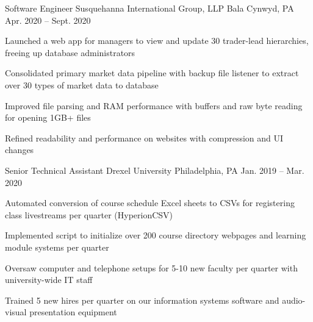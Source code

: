 

\begin{cventries}

  \cventry
  {Software Engineer} %
  {Susquehanna International Group, LLP} %
  {Bala Cynwyd, PA} %
  {Apr. 2020 -- Sept. 2020} %
  {
    \begin{cvitems} %
      \item {Launched a web app for managers to view and update 30 trader-lead hierarchies, freeing up database administrators}
      \item {Consolidated primary market data pipeline with backup file listener to extract over 30 types of market data to database}
      \item {Improved file parsing and RAM performance with buffers and raw byte reading for opening 1GB+ files}
      \item {Refined readability and performance on websites with compression and UI changes}
    \end{cvitems}
  }

  \cventry
  {Senior Technical Assistant} %
  {Drexel University} %
  {Philadelphia, PA} %
  {Jan. 2019 -- Mar. 2020} %
  {
    \begin{cvitems} %
      \item {Automated conversion of course schedule Excel sheets to CSVs for registering class livestreams per quarter (HyperionCSV)}
      \item {Implemented script to initialize over 200 course directory webpages and learning module systems per quarter}
      \item {Oversaw computer and telephone setups for 5-10 new faculty per quarter with university-wide IT staff}
      \item {Trained 5 new hires per quarter on our information systems software and audio-visual presentation equipment}
    \end{cvitems}
  }

\end{cventries}
